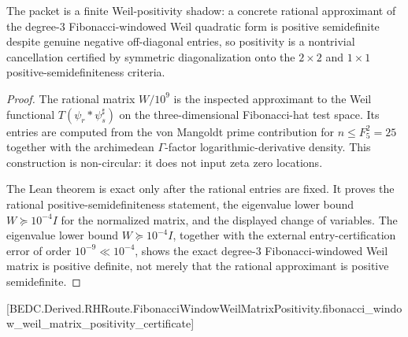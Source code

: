 \begin{theorem}
\label{thm:fibonacci-window-weil-shadow-boundary}
The packet is a finite Weil-positivity shadow: a concrete rational approximant of the degree-$3$ Fibonacci-windowed Weil quadratic form is positive semidefinite despite genuine negative off-diagonal entries, so positivity is a nontrivial cancellation certified by symmetric diagonalization onto the $2\times2$ and $1\times1$ positive-semidefiniteness criteria.
\end{theorem}
\begin{proof}
The rational matrix $W/10^9$ is the inspected approximant to the Weil functional $T(\psi_r*\psi_s^\sharp)$ on the three-dimensional Fibonacci-hat test space. Its entries are computed from the von Mangoldt prime contribution for $n\leq F_5^2=25$ together with the archimedean $\Gamma$-factor logarithmic-derivative density. This construction is non-circular: it does not input zeta zero locations.

The Lean theorem is exact only after the rational entries are fixed. It proves the rational positive-semidefiniteness statement, the eigenvalue lower bound $W\succeq 10^{-4}I$ for the normalized matrix, and the displayed change of variables. The eigenvalue lower bound $W\succeq 10^{-4}I$, together with the external entry-certification error of order $10^{-9}\ll 10^{-4}$, shows the exact degree-$3$ Fibonacci-windowed Weil matrix is positive definite, not merely that the rational approximant is positive semidefinite.
\end{proof}



[BEDC.Derived.RHRoute.FibonacciWindowWeilMatrixPositivity.fibonacci\_window\_weil\_matrix\_positivity\_certificate]

